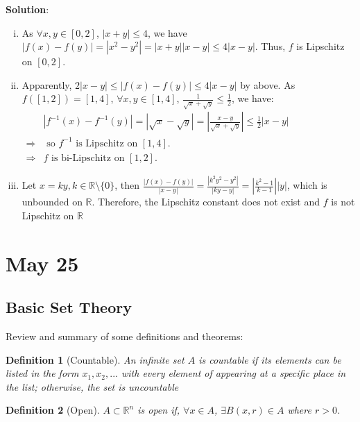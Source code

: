 \documentclass[12pt, a4paper]{article}
\newtheorem{definition}{Definition}[subsection]
\begin{document}
\textbf{Solution}: 
\begin{enumerate}[(i)]
    \item As $\forall x, y\in [0,2]$, $|x+y|\leq 4$, we have $|f(x)-f(y)|=\left|x^{2}-y^{2}\right|=|x+y||x-y| \leq 4|x-y|$.
    Thus, $f$ is Lipschitz on $[0,2]$.
    \item Apparently, $2|x-y|\leq|f(x) - f(y)|\leq 4|x-y|$ by above. As $f([1, 2]) = [1, 4]$, $\forall x, y \in [1, 4]$, $\displaystyle \frac{1}{\sqrt{x}+\sqrt{y}} \leq \frac{1}{2}$, we have: \\
    \(
    \begin{aligned}
        &\displaystyle \left|f^{-1}(x)-f^{-1}(y)\right|=|\sqrt{x}-\sqrt{y}|=\left|\frac{x-y}{\sqrt{x}+\sqrt{y}}\right| \leq \frac{1}{2}|x-y|\\
        \Rightarrow & \text{ so } f^{-1} \text{ is Lipschitz on } [1,4]. \\
        \Rightarrow & f \text{ is bi-Lipschitz on }[1,2].
    \end{aligned}
    \)
    \item Let $x = ky, k\in\mathbb{R}\setminus\{0\}$, then $\displaystyle \frac{|f(x) - f(y)|}{|x - y|} = \frac{|k^2y^2 - y^2|}{|ky - y|} = \left|\frac{k^2 - 1}{k-1} \right | |y|$, which is unbounded on $\mathbb{R}$. Therefore, the Lipschitz constant does not exist and $f$ is not Lipschitz on $\mathbb{R}$

\end{enumerate}


\newpage
\section{May 25}
\subsection{Basic Set Theory}

Review and summary of some definitions and theorems:

\begin{definition}[Countable]
    An infinite set $A$ is countable if its elements 
    can be listed in the form $x_1, x_2, ...$ with every 
    element of appearing at a specific place in the list; 
    otherwise, the set is uncountable
\end{definition}

\begin{definition}[Open]
    $A \subset \mathbb{R}^n$ is open if, $\forall x\in A$, $\exists B(x, r)\in A$ where $r>0$.
\end{definition}
\end{document}
